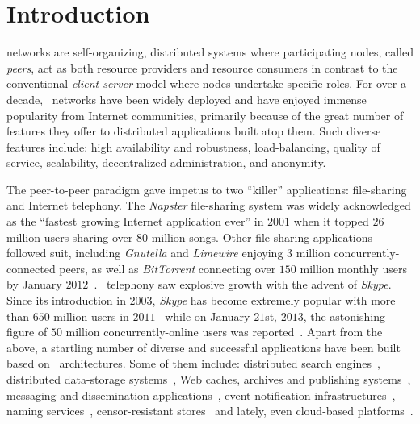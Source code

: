 \section{Introduction}
\label{section:intro}

 networks are self-organizing, distributed systems where
participating nodes, called \emph{peers}, act as both resource providers and
resource consumers in contrast to the conventional \emph{client-server} model
where nodes undertake specific roles.
For over a decade, \p\ networks have been widely deployed and have
enjoyed immense popularity from Internet communities, primarily because
of the great number of features they offer to distributed applications 
built atop them. 
Such diverse features include:  high availability and robustness,
load-balancing, quality of service, scalability, decentralized administration,
and anonymity. 

The peer-to-peer paradigm gave impetus to two ``killer'' applications:
file-sharing and Internet telephony.
The {\sl Napster} file-sharing system was widely acknowledged as the 
``fastest growing Internet application ever'' in $2001$ when it topped
$26$ million users sharing over $80$ million songs.
Other file-sharing applications followed suit, 
including {\sl Gnutella} and {\sl Limewire} enjoying $3$ 
million concurrently-connected peers, as well as 
{\sl BitTorrent} connecting over $150$ million monthly users by January $2012$~\cite{bittorrentusers}.
\p\ telephony saw explosive growth with the advent of {\sl Skype}.
Since its introduction in $2003$,
{\sl Skype} has become extremely popular with more than $650$ million users 
in $2011$~\cite{skypetotalusers} while on January $21$st, $2013$,
the astonishing figure of $50$ million concurrently-online users
was reported~\cite{skypesymusers}.
Apart from the above, a startling number of diverse and successful
applications have been built based on \p\ architectures. Some of them include:
distributed search engines~\cite{yaci}, 
distributed data-storage systems~\cite{kbc_oceanstore_2000,bdet_fsdfs_2000,dkkms_cfs_2001,dr_pastutility_2001,abc_farsite_2002,mmfc_ivy_2002,arla,agebh_dks_2003},
Web caches, archives and publishing systems~\cite{ird_squirrel_2002,bags_youserv_2002,wrc_publius_2000,wm_tangler_2001},
messaging and dissemination applications~\cite{threedegrees,icpp08-pd}, 
event-notification infrastructures~\cite{rkcd_scribe_2001,cdkr_scribe_2002,agebh_dks_2003}, 
naming services~\cite{cmm_chorddns_2002}, 
censor-resistant stores~\cite{cswh_freenet_2001} and
lately, even cloud-based platforms~\cite{mgpj_cloudsnap_2011}.

